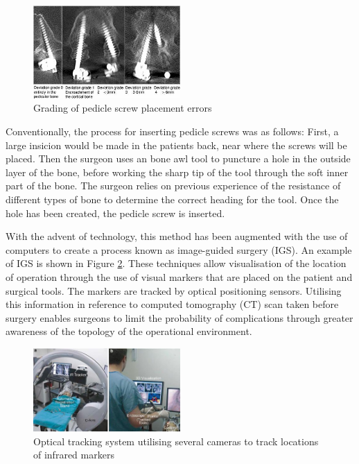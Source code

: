 \documentclass[conference, a4paper]{IEEEtran}
\begin{document}
\begin{figure}[h!]
	\centering
	\includegraphics[width=0.5\textwidth]{assets/deviation.jpg}
	\caption{Grading of pedicle screw placement errors}
	\label{fig:dev}
\end{figure}


Conventionally, the process for inserting pedicle screws was as follows:
First, a large insicion would be made in the patients back, near
where the screws will be placed. Then the surgeon uses an bone awl tool
to puncture a hole in the outside layer of the bone, before working the
sharp tip of the tool through the soft inner part of the bone. The surgeon
relies on previous experience of the resistance of different types of bone to
determine the correct heading for the tool. Once the hole has been created,
the pedicle screw is inserted\cite{Manbachi2016}.

With the advent of technology, this method has been augmented with the use of computers to
create a process known as image-guided surgery (IGS)\cite{Azad2016}. An example of IGS is shown in Figure \ref{fig:igs}.
These techniques allow
visualisation of the location of operation through the use of visual markers that are
placed on the patient and surgical tools. The markers are tracked by optical positioning sensors. Utilising this
information in reference to computed tomography (CT) scan taken before surgery enables surgeons to limit the
probability of complications through greater awareness of the topology of the operational environment\cite{Costa2011}.

\begin{figure}[h!]
	\centering
	\includegraphics[width=0.5\textwidth]{assets/igs}
	\caption{Optical tracking system utilising several cameras to track locations of infrared markers\cite{Manbachi2016}}
	\label{fig:igs}
\end{figure}
\end{document}
